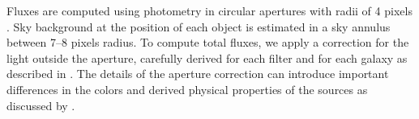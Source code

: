 \documentclass[linenumbers]{aastex63}
\begin{document}
Fluxes are computed using photometry in circular apertures with radii of 4 pixels \citep[$\sim$ 0; which subtends 3.4 to 18 pc for galaxy distances 5 to 23 Mpc spanned by the PHANGS-HST sample, see][Table 1]{lee_phangs-hst_2022}. Sky background at the position of each object is estimated in a sky annulus between 7--8 pixels radius. To compute total fluxes, we apply a correction for the light outside the aperture, carefully derived for each filter and for each galaxy as described in \cite{deger_bright_2022}.  The details of the aperture correction can introduce important differences in the colors and derived physical properties of the sources as discussed by \cite{deger_bright_2022}.



\end{document}
